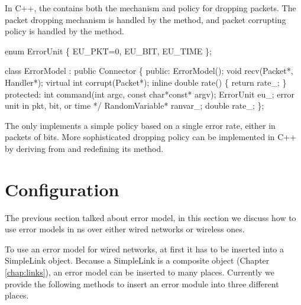 In C++, the  contains both the mechanism and policy for
dropping packets.  The packet dropping mechanism is handled by the
 method, and packet corrupting policy is handled by the
 method.
\begin{program}
        enum ErrorUnit \{ EU_PKT=0, EU_BIT, EU_TIME \};

        class ErrorModel : public Connector \{
        public:
                ErrorModel();
                void recv(Packet*, Handler*);
                virtual int corrupt(Packet*);
                inline double rate() \{ return rate_; \}
        protected:
                int command(int argc, const char*const* argv);
                ErrorUnit eu_;          \* error unit in pkt, bit, or time */
                RandomVariable* ranvar_;
                double rate_;
        \};
\end{program}
The  only implements a simple policy based on a single
error rate, either in packets of bits.  More sophisticated dropping
policy can be implemented in C++ by deriving from  and
redefining its  method.


\section{Configuration}

The previous section talked about error model, in this section we
discuss how to use error models in ns over either wired networks or
wireless ones. 

To use an error model for wired networks, at first it has to be
inserted into a SimpleLink object. Because a SimpleLink is a composite
object (Chapter \ref{chap:links}), an error model can be inserted to
many places. Currently we provide the following methods to insert an
error module into three different places.

